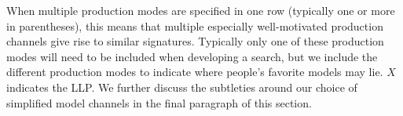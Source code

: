 When multiple production modes are specified in one row (typically one
or more in parentheses), this means that multiple especially
well-motivated production channels give rise to similar
signatures. Typically only one of these production modes will need to
be included when developing a search, but we include the different production modes
to indicate where people's favorite models may lie. $X$ indicates the
LLP. We further discuss the subtleties around our choice of simplified model channels in the final paragraph of this section.  
  


